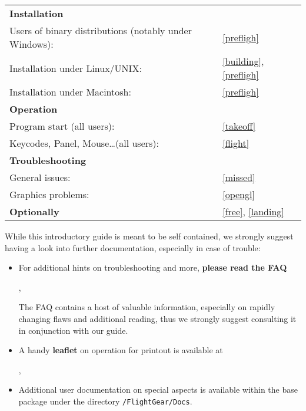 \noindent
\begin{tabular}{ll}
 \textbf{Installation}                                  	&\\
 Users of binary distributions (notably under Windows):	 	& \ref{prefligh}\\
 Installation under Linux/UNIX:               				 		& \ref{building}, \ref{prefligh}\\
 Installation under Macintosh:               							& \ref{prefligh}\\
  \textbf{Operation}                           						& \\
 Program start (all users):                      					& \ref{takeoff}\\
 Keycodes, Panel, Mouse\ldots (all users):       					& \ref{flight}\\
 \textbf{Troubleshooting}                      						& \\
 General issues:																						&  \ref{missed}\\
 Graphics problems: 									            				& \ref{opengl}\\
 \textbf{Optionally}                           						& \ref{free}, \ref{landing} 
\end{tabular}
\bigskip

\noindent
 While this introductory guide is meant to be self contained, we strongly suggest having a look into further documentation, especially in case of trouble:

\begin{itemize}
 \item For additional hints on troubleshooting and more, \textbf{please read the FAQ} 
 \medskip

 \noindent
 ,
 
 The FAQ contains a host of valuable information, especially on rapidly changing flaws and additional reading, thus we strongly suggest consulting it in conjunction with our guide.
 
 
 \item A handy \textbf{leaflet} on operation for printout is available at
 \medskip

 \noindent
 ,
 \item Additional user documentation on special aspects is available within the base package under the directory \texttt{/FlightGear/Docs}.
 \end{itemize}

